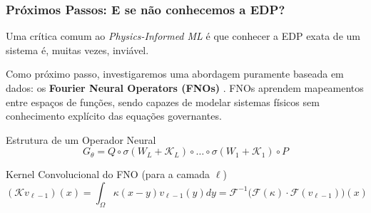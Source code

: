 \documentclass[usenames,dvipsnames,brazil,aspectratio=169]{beamer}
\begin{document}
\begin{frame}[t]
    \frametitle{Próximos Passos: E se não conhecemos a EDP?}
    Uma crítica comum ao \textit{Physics-Informed ML} é que conhecer a EDP exata de um sistema é, muitas vezes, inviável.
    \vspace{0.3cm}

    Como próximo passo, investigaremos uma abordagem puramente baseada em dados: os \textbf{Fourier Neural Operators (FNOs)} \parencite{li2020}. FNOs aprendem mapeamentos entre espaços de funções, sendo capazes de modelar sistemas físicos sem conhecimento explícito das equações governantes.

    \begin{center}
        \begin{minipage}{0.9\textwidth} %
            \begin{block}{Estrutura de um Operador Neural}
                $$G_\theta = Q \circ \sigma(W_L + \mathcal{K}_L) \circ \dots \circ \sigma(W_1 + \mathcal{K}_1) \circ P$$
            \end{block}
            
            \begin{block}{Kernel Convolucional do FNO (para a camada $\ell$)}
                 $$
                 (\mathcal{K}v_{\ell-1})(x) = \int_{\Omega} \kappa(x-y)v_{\ell-1}(y)dy = \mathcal{F}^{-1}\big( \mathcal{F}(\kappa) \cdot \mathcal{F}(v_{\ell-1}) \big)(x)
                 $$
            \end{block}
        \end{minipage}
    \end{center}
\end{frame}
\end{document}
